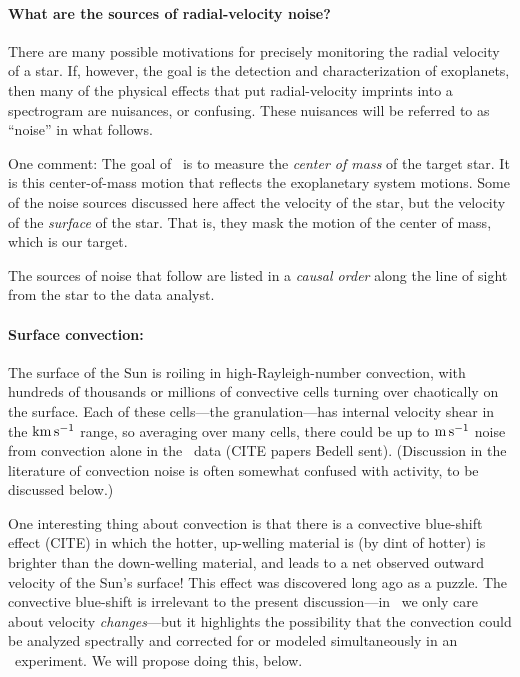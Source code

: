 \documentclass[12pt, fullpage, letterpaper]{article}
\begin{document}
\paragraph{What are the sources of radial-velocity noise?}
There are many possible motivations for precisely monitoring the radial
velocity of a star.
If, however, the goal is the detection and characterization of exoplanets,
then many of the physical effects that put radial-velocity imprints into
a spectrogram are nuisances, or confusing.
These nuisances will be referred to as ``noise'' in what follows.

One comment: The goal of \EPRV\ is to measure the \emph{center of mass} of
the target star.
It is this center-of-mass motion that reflects the exoplanetary system motions.
Some of the noise sources discussed here affect the velocity of the star,
but the velocity of the \emph{surface} of the star. That is, they mask the
motion of the center of mass, which is our target.

The sources of noise that follow are listed in a \emph{causal order} along the
line of sight from the star to the data analyst.

\paragraph{Surface convection:}
The surface of the Sun is roiling in high-Rayleigh-number convection,
with hundreds of thousands or millions of convective cells turning
over chaotically on the surface. Each of these cells---the granulation---has internal
velocity shear in the ${\mathrm{km\,s^{-1}}}$ range, so averaging over many cells,
there could be up to ${\mathrm{m\,s^{-1}}}$ noise from convection alone in the
\EPRV\ data (CITE papers Bedell sent).
(Discussion in the literature of convection noise is often somewhat
confused with activity, to be discussed below.)

One interesting thing about convection is that there is a convective
blue-shift effect (CITE) in which the hotter, up-welling material is
(by dint of hotter) is brighter than the down-welling material, and leads
to a net observed outward velocity of the Sun's surface!
This effect was discovered long ago as a puzzle.
The convective blue-shift is irrelevant to the present discussion---in
\EPRV\ we only care about velocity \emph{changes}---but it highlights
the possibility that the convection could be analyzed spectrally and
corrected for or modeled simultaneously in an \EPRV\ experiment. We
will propose doing this, below.
\end{document}
